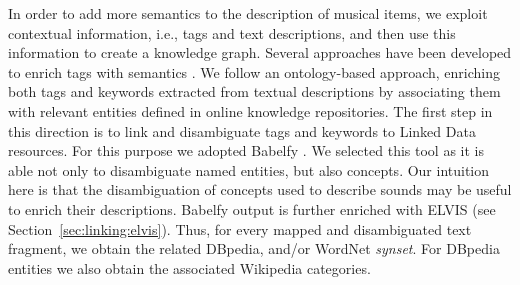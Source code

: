 In order to add more semantics to the description of musical items, we exploit contextual information, i.e., tags and text descriptions, %
and then use this information to create a knowledge graph. 
Several approaches have been developed to enrich tags with semantics \citep{Garcia2012}. We follow an ontology-based approach, enriching both tags and keywords extracted from textual descriptions by associating them with relevant entities defined in online knowledge repositories.
The first step in this direction is to link and disambiguate tags and keywords to Linked Data resources. 
For this purpose we adopted Babelfy %
\citep{Moroetal2014}. We selected this tool as it is able not only to disambiguate named entities, but also concepts. Our intuition here is that the disambiguation of concepts used to describe sounds may be useful to enrich their descriptions. Babelfy output is further enriched with ELVIS (see Section~\ref{sec:linking:elvis}). Thus, for every mapped and disambiguated text fragment, we obtain the related DBpedia, and/or WordNet \textit{synset}. For DBpedia entities we also obtain the associated Wikipedia categories.


